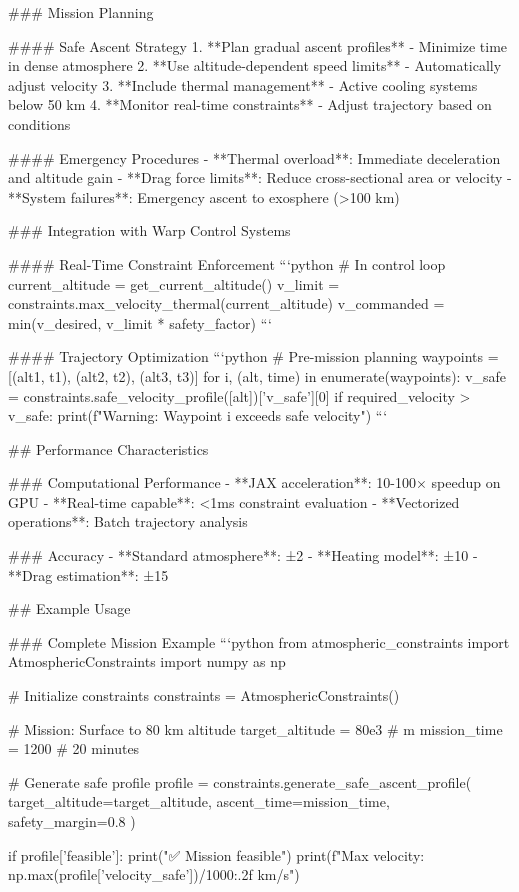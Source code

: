 ### Mission Planning

#### Safe Ascent Strategy
1. **Plan gradual ascent profiles** - Minimize time in dense atmosphere
2. **Use altitude-dependent speed limits** - Automatically adjust velocity
3. **Include thermal management** - Active cooling systems below 50 km
4. **Monitor real-time constraints** - Adjust trajectory based on conditions

#### Emergency Procedures
- **Thermal overload**: Immediate deceleration and altitude gain
- **Drag force limits**: Reduce cross-sectional area or velocity
- **System failures**: Emergency ascent to exosphere (>100 km)

### Integration with Warp Control Systems

#### Real-Time Constraint Enforcement
```python
# In control loop
current_altitude = get_current_altitude()
v_limit = constraints.max_velocity_thermal(current_altitude)
v_commanded = min(v_desired, v_limit * safety_factor)
```

#### Trajectory Optimization
```python
# Pre-mission planning
waypoints = [(alt1, t1), (alt2, t2), (alt3, t3)]
for i, (alt, time) in enumerate(waypoints):
    v_safe = constraints.safe_velocity_profile([alt])['v_safe'][0]
    if required_velocity > v_safe:
        print(f"Warning: Waypoint {i} exceeds safe velocity")
```

## Performance Characteristics

### Computational Performance
- **JAX acceleration**: 10-100× speedup on GPU
- **Real-time capable**: <1ms constraint evaluation
- **Vectorized operations**: Batch trajectory analysis

### Accuracy
- **Standard atmosphere**: ±2%
- **Heating model**: ±10%
- **Drag estimation**: ±15%

## Example Usage

### Complete Mission Example
```python
from atmospheric_constraints import AtmosphericConstraints
import numpy as np

# Initialize constraints
constraints = AtmosphericConstraints()

# Mission: Surface to 80 km altitude
target_altitude = 80e3  # m
mission_time = 1200     # 20 minutes

# Generate safe profile
profile = constraints.generate_safe_ascent_profile(
    target_altitude=target_altitude,
    ascent_time=mission_time,
    safety_margin=0.8
)

if profile['feasible']:
    print("✅ Mission feasible")
    print(f"Max velocity: {np.max(profile['velocity_safe'])/1000:.2f} km/s")
    
